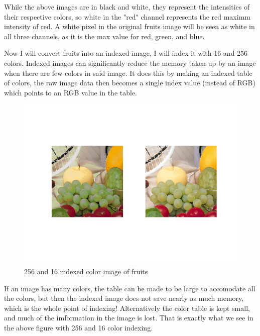 While the above images are in black and white, they represent the intensities of
their respective colors, so white in the "red" channel represents the red maximm
intensity of red. A white pixel in the original fruits image will be seen as
white in all three channels, as it is the max value for red, green, and blue.

Now I will convert fruits into an indexed image, I will index it with 16 and 256
colors. Indexed images can significantly reduce the memory taken up by an image
when there are few colors in said image. It does this by making an indexed table
of colors, the raw image data then becomes a single index value (instead of RGB)
which points to an RGB value in the table.

\begin{figure}[H]
    \centering
    \includegraphics[scale=0.5]{indexed}
    \caption{256 and 16 indexed color image of fruits}
\end{figure}

If an image has many colors, the table can be made to be large to accomodate all
the colors, but then the indexed image does not save nearly as much memory,
which is the whole point of indexing! Alternatively the color table is kept
small, and much of the imformation in the image is lost. That is exactly what we
see in the above figure with 256 and 16 color indexing.

